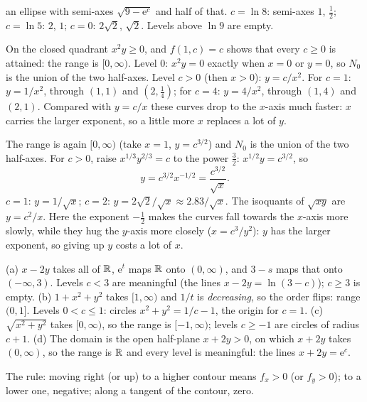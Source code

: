\begin{solutions}
        an ellipse with semi-axes $\sqrt{9-\mathrm{e}^{c}}$ and half of
        that. $c=\ln8$: semi-axes $1$, $\tfrac12$; $c=\ln5$: $2$, $1$;
        $c=0$: $2\sqrt2$, $\sqrt2$. Levels above $\ln9$ are empty.
  \item On the closed quadrant $x^{2}y\ge0$, and $f(1,c)=c$ shows that
        every $c\ge0$ is attained: the range is $[0,\infty)$. Level $0$:
        $x^{2}y=0$ exactly when $x=0$ or $y=0$, so $N_{0}$ is the union of
        the two half-axes. Level $c>0$ (then $x>0$): $y=c/x^{2}$. For
        $c=1$: $y=1/x^{2}$, through $(1,1)$ and $(2,\tfrac14)$; for $c=4$:
        $y=4/x^{2}$, through $(1,4)$ and $(2,1)$. Compared with $y=c/x$
        these curves drop to the $x$-axis much faster: $x$ carries the
        larger exponent, so a little more $x$ replaces a lot of $y$.
  \item The range is again $[0,\infty)$ (take $x=1$, $y=c^{3/2}$) and
        $N_{0}$ is the union of the two half-axes. For $c>0$, raise
        $x^{1/3}y^{2/3}=c$ to the power $\tfrac32$: $x^{1/2}y=c^{3/2}$, so
        \[
          y=c^{3/2}x^{-1/2}=\frac{c^{3/2}}{\sqrt x} .
        \]
        $c=1$: $y=1/\sqrt x$; $c=2$: $y=2\sqrt2/\sqrt x\approx2.83/\sqrt x$.
        The isoquants of $\sqrt{xy}$ are $y=c^{2}/x$. Here the exponent
        $-\tfrac12$ makes the curves fall towards the $x$-axis more
        slowly, while they hug the $y$-axis more closely
        ($x=c^{3}/y^{2}$): $y$ has the larger exponent, so giving up $y$
        costs a lot of $x$.
  \item (a) $x-2y$ takes all of $\mathbb{R}$, $\mathrm{e}^{t}$ maps $\mathbb{R}$ onto
        $(0,\infty)$, and $3-s$ maps that onto $(-\infty,3)$. Levels $c<3$
        are meaningful (the lines $x-2y=\ln(3-c)$); $c\ge3$ is empty.
        (b) $1+x^{2}+y^{2}$ takes $[1,\infty)$ and $1/t$ is
        \emph{decreasing}, so the order flips: range $(0,1]$. Levels
        $0<c\le1$: circles $x^{2}+y^{2}=1/c-1$, the origin for $c=1$.
        (c) $\sqrt{x^{2}+y^{2}}$ takes $[0,\infty)$, so the range is
        $[-1,\infty)$; levels $c\ge-1$ are circles of radius $c+1$.
        (d) The domain is the open half-plane $x+2y>0$, on which $x+2y$
        takes $(0,\infty)$, so the range is $\mathbb{R}$ and every level is
        meaningful: the lines $x+2y=\mathrm{e}^{c}$.
  \item The rule: moving right (or up) to a higher contour means $f_{x}>0$
        (or $f_{y}>0$); to a lower one, negative; along a tangent of the
        contour, zero.
        \begin{itemize}[leftmargin=1.2em,itemsep=0.2ex]

\end{itemize}
\end{solutions}
